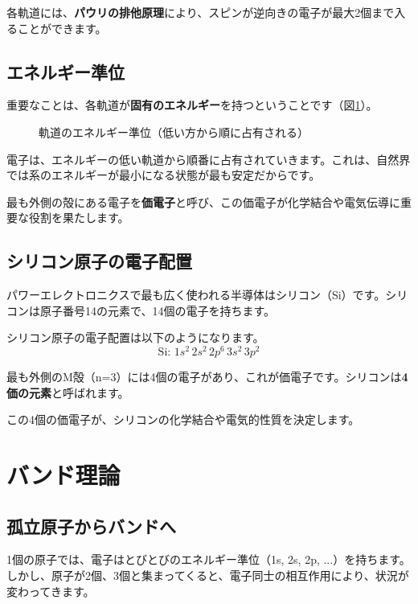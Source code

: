 各軌道には、\textbf{パウリの排他原理}により、スピンが逆向きの電子が最大2個まで入ることができます。

\subsection{エネルギー準位}

重要なことは、各軌道が\textbf{固有のエネルギー}を持つということです（図\ref{fig:energy_level}）。

\begin{figure}[H]
\centering
{}
\caption{軌道のエネルギー準位（低い方から順に占有される）}
\label{fig:energy_level}
\end{figure}

電子は、エネルギーの低い軌道から順番に占有されていきます。これは、自然界では系のエネルギーが最小になる状態が最も安定だからです。

最も外側の殻にある電子を\textbf{価電子}と呼び、この価電子が化学結合や電気伝導に重要な役割を果たします。

\subsection{シリコン原子の電子配置}

パワーエレクトロニクスで最も広く使われる半導体はシリコン（Si）です。シリコンは原子番号14の元素で、14個の電子を持ちます。

シリコン原子の電子配置は以下のようになります。
\begin{equation}
\text{Si: } 1s^2 \, 2s^2 \, 2p^6 \, 3s^2 \, 3p^2
\end{equation}

最も外側のM殻（n=3）には4個の電子があり、これが価電子です。シリコンは\textbf{4価の元素}と呼ばれます。

この4個の価電子が、シリコンの化学結合や電気的性質を決定します。


\section{バンド理論}

\subsection{孤立原子からバンドへ}

1個の原子では、電子はとびとびのエネルギー準位（1s, 2s, 2p, ...）を持ちます。しかし、原子が2個、3個と集まってくると、電子同士の相互作用により、状況が変わってきます。

